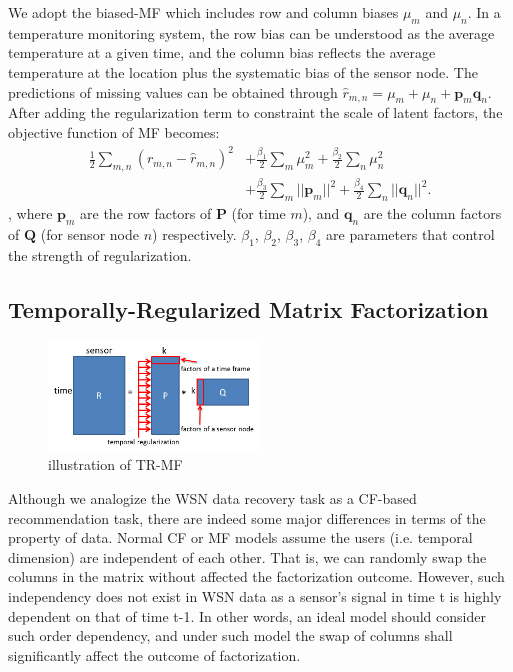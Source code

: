 We adopt the biased-MF which includes row and column biases $\mu_m$ and $\mu_n$. %
In a temperature monitoring system, the row bias can be understood as the average temperature at a given time, and the column bias reflects the average temperature at the location plus the systematic bias of the sensor node.
The predictions of missing values can be obtained through $\hat{r}_{m,n} = \mu_m + \mu_n + \mathbf{p}_m \mathbf{q}_n$.
After adding the regularization term to constraint the scale of latent factors, the objective function of MF becomes:
\begin{equation*}\begin{aligned}
\frac{1}{2}\sum_{m,n}{(r_{m,n} - \hat{r}_{m,n})}^2 & + \frac{\beta_1}{2}\sum_m{\mu_m^2} + \frac{\beta_2}{2}\sum_n{\mu_n^2}\\
& + \frac{\beta_3}{2}\sum_m{||\mathbf{p}_m||^2} + \frac{\beta_4}{2}\sum_n{||\mathbf{q}_n||^2}.
\end{aligned}\end{equation*}
, where $\mathbf{p}_m$ are the row factors of $\mathbf{P}$ (for time $m$), and $\mathbf{q}_n$ are the column factors of $\mathbf{Q}$ (for sensor node $n$) respectively.
$\beta_1$, $\beta_2$, $\beta_3$, $\beta_4$ are parameters that control the strength of regularization.

\subsection{Temporally-Regularized Matrix Factorization}

\begin{figure}[htbp]
	\centering
	\includegraphics[width=0.5\textwidth]{TRMF_illustration.png}
	\caption{illustration of TR-MF}
\end{figure}


Although we analogize the WSN data recovery task as a CF-based recommendation task, there are indeed some major differences in terms of the property of data.
Normal CF or MF models assume the users (i.e. temporal dimension) are independent of each other. That is, we can randomly swap the columns in the matrix without affected the factorization outcome. However, such independency does not exist in WSN data as a sensor's signal in time t is highly dependent on that of time t-1. In other words, an ideal model should consider such order dependency, and under such model the swap of columns shall significantly affect the outcome of factorization.

